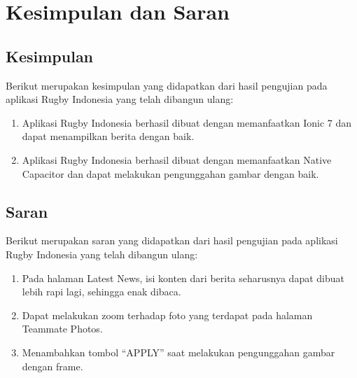 \chapter{Kesimpulan dan Saran}
\label{chap:kesimpulan-dan-saran}

\section{Kesimpulan}
Berikut merupakan kesimpulan yang didapatkan dari hasil pengujian pada aplikasi Rugby Indonesia yang telah dibangun ulang:
\begin{enumerate}
    \item Aplikasi Rugby Indonesia berhasil dibuat dengan memanfaatkan Ionic 7 dan dapat menampilkan berita dengan baik.
    \item Aplikasi Rugby Indonesia berhasil dibuat dengan memanfaatkan Native Capacitor dan dapat melakukan pengunggahan gambar dengan baik.
\end{enumerate}

\section{Saran}
Berikut merupakan saran yang didapatkan dari hasil pengujian pada aplikasi Rugby Indonesia yang telah dibangun ulang:
\begin{enumerate}
    \item Pada halaman Latest News, isi konten dari berita seharusnya dapat dibuat lebih rapi lagi, sehingga enak dibaca.
    \item Dapat melakukan zoom terhadap foto yang terdapat pada halaman Teammate Photos.
    \item Menambahkan tombol ``APPLY'' saat melakukan pengunggahan gambar dengan frame.
\end{enumerate}